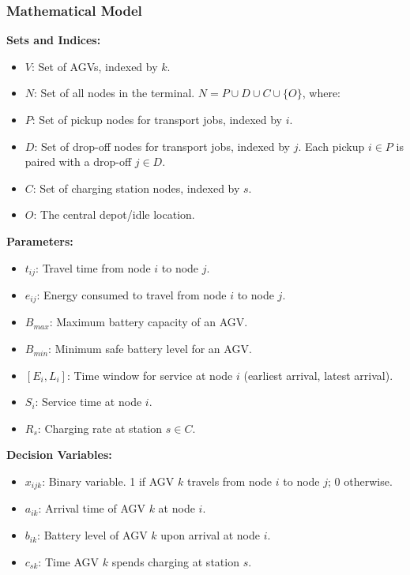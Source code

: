 \documentclass{article}
\begin{document}
\subsubsection*{Mathematical Model}
\noindent \textbf{Sets and Indices:}
\begin{itemize}
    \item $V$: Set of AGVs, indexed by $k$.
    \item $N$: Set of all nodes in the terminal. $N = P \cup D \cup C \cup \{O\}$, where:
    \item $P$: Set of pickup nodes for transport jobs, indexed by $i$.
    \item $D$: Set of drop-off nodes for transport jobs, indexed by $j$. Each pickup $i \in P$ is paired with a drop-off $j \in D$.
    \item $C$: Set of charging station nodes, indexed by $s$.
    \item $O$: The central depot/idle location.
\end{itemize}

\noindent \textbf{Parameters:}
\begin{itemize}
    \item $t_{ij}$: Travel time from node $i$ to node $j$.
    \item $e_{ij}$: Energy consumed to travel from node $i$ to node $j$.
    \item $B_{max}$: Maximum battery capacity of an AGV.
    \item $B_{min}$: Minimum safe battery level for an AGV.
    \item $[E_i, L_i]$: Time window for service at node $i$ (earliest arrival, latest arrival).
    \item $S_i$: Service time at node $i$.
    \item $R_s$: Charging rate at station $s \in C$.
\end{itemize}

\noindent \textbf{Decision Variables:}
\begin{itemize}
    \item $x_{ijk}$: Binary variable. 1 if AGV $k$ travels from node $i$ to node $j$; 0 otherwise.
    \item $a_{ik}$: Arrival time of AGV $k$ at node $i$.
    \item $b_{ik}$: Battery level of AGV $k$ upon arrival at node $i$.
    \item $c_{sk}$: Time AGV $k$ spends charging at station $s$.
\end{itemize}
\end{document}
